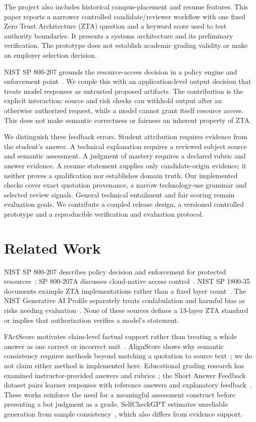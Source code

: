 \documentclass[conference]{IEEEtran}
\begin{document}
The project also includes historical campus-placement and resume features. This paper reports a narrower controlled candidate/reviewer workflow with one fixed Zero Trust Architecture (ZTA) question and a keyword score used to test authority boundaries. It presents a systems architecture and its preliminary verification. The prototype does not establish academic grading validity or make an employer selection decision.

NIST SP 800-207 grounds the resource-access decision in a policy engine and enforcement point~\cite{rose2020zero}. We couple this with an application-level output decision that treats model responses as untrusted proposed artifacts. The contribution is the explicit interaction: source and risk checks can withhold output after an otherwise authorized request, while a model cannot grant itself resource access. This does not make semantic correctness or fairness an inherent property of ZTA.

We distinguish three feedback errors. Student attribution requires evidence from the student's answer. A technical explanation requires a reviewed subject source and semantic assessment. A judgment of mastery requires a declared rubric and answer evidence. A resume statement supplies only candidate-origin evidence; it neither proves a qualification nor establishes domain truth. Our implemented checks cover exact quotation provenance, a narrow technology-use grammar and selected review signals. General technical entailment and fair scoring remain evaluation goals. We contribute a coupled release design, a versioned controlled prototype and a reproducible verification and evaluation protocol.

\section{Related Work}
NIST SP 800-207 describes policy decision and enforcement for protected resources~\cite{rose2020zero}; SP 800-207A discusses cloud-native access control~\cite{chandramouli2023zero}. NIST SP 1800-35 documents example ZTA implementations rather than a fixed layer count~\cite{nist2025implementation}. The NIST Generative AI Profile separately treats confabulation and harmful bias as risks needing evaluation~\cite{nist2024genai}. None of these sources defines a 13-layer ZTA standard or implies that authorization verifies a model's statement.

FActScore motivates claim-level factual support rather than treating a whole answer as one correct or incorrect unit~\cite{min2023factscore}. AlignScore shows why semantic consistency requires methods beyond matching a quotation to source text~\cite{zha2023alignscore}; we do not claim either method is implemented here. Educational grading research has examined instructor-provided answers and rubrics~\cite{golchin2025grading}; the Short Answer Feedback dataset pairs learner responses with reference answers and explanatory feedback~\cite{filighera2022feedback}. These works reinforce the need for a meaningful assessment construct before presenting a bot judgment as a grade. SelfCheckGPT estimates unreliable generation from sample consistency~\cite{manakul2023selfcheck}, which also differs from evidence support.
\end{document}
